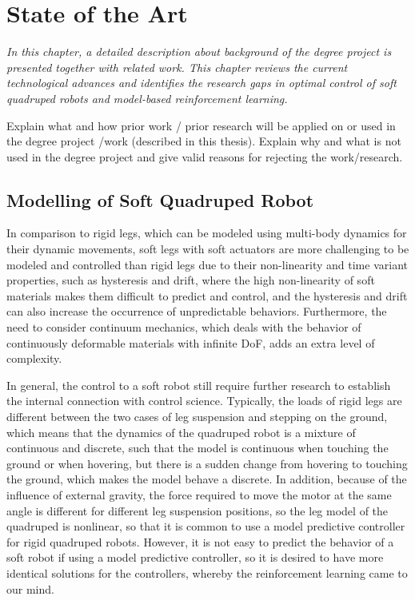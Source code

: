\chapter{State of the Art}
\label{chap2}
\textit{In this chapter, a detailed description about background of the degree project is presented together with related work. This chapter reviews the current technological advances and identifies the research gaps in optimal control of soft quadruped robots and model-based reinforcement learning.}

Explain what and how prior work / prior research will be applied on or used in the degree project /work (described in this thesis). Explain why and what is not used in the degree project and give valid reasons for rejecting the work/research.
\section{Modelling of Soft Quadruped Robot}
 In comparison to rigid legs, which can be modeled using multi-body dynamics for their dynamic movements, soft legs with soft actuators are more challenging to be modeled and controlled than rigid legs due to their non-linearity\cite{slotineAppliedNonlinearControl1991} and time variant properties\cite{wangControlStrategiesSoft2022}, such as hysteresis and drift, where the high non-linearity of soft materials makes them difficult to predict and control, and the hysteresis and drift can also increase the occurrence of unpredictable behaviors. Furthermore, the need to consider continuum mechanics, which deals with the behavior of continuously deformable materials with infinite \ac{DoF}\cite{polygerinosSoftRoboticsReview2017}, adds an extra level of complexity. 

In general, the control to a soft robot still require further research to establish the internal connection with control science\cite{wangControlStrategiesSoft2022}. Typically, the loads of rigid legs are different between the two cases of leg suspension and stepping on the ground\cite{biswalDevelopmentQuadrupedWalking2021}, which means that the dynamics of the quadruped robot is a mixture of continuous and discrete, such that the model is continuous when touching the ground or when hovering, but there is a sudden change from hovering to touching the ground, which makes the model behave a discrete. In addition, because of the influence of external gravity, the force required to move the motor at the same angle is different for different leg suspension positions, so the leg model of the quadruped is nonlinear, so that it is common to use a model predictive controller for rigid quadruped robots. However, it is not easy to predict the behavior of a soft robot if using a model predictive controller\cite{BemporadLinearTimevaryingNonlinearMPC}, so it is desired to have more identical solutions for the controllers, whereby the  reinforcement learning came to our mind\cite{hewingLearningbasedModelPredictive2020}. 


